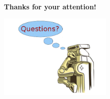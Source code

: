 
\begin{frame}
\vspace{1cm}
\centering\textbf{Thanks for your attention!\\}

\vspace{4ex}\hspace{22ex}\includegraphics[width=5.5cm]{../images/pr2_questions.png}
\end{frame}
